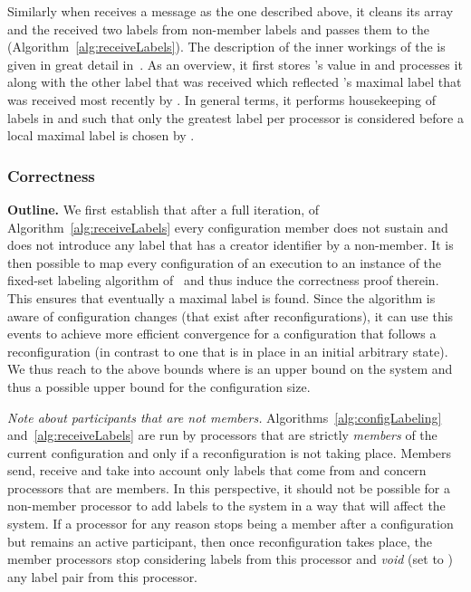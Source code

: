 \documentclass[11pt]{article}
\begin{document}
Similarly when  receives a message as the one described above, it cleans its  array and the received two labels from non-member labels and passes them to the  (Algorithm~\ref{alg:receiveLabels}).
The description of the inner workings of the  is given in great detail in~\cite{SSVS}. 
As an overview, it first stores 's value in  and processes it along with the other label that was received which reflected 's maximal label that was received most recently by .
In general terms, it performs housekeeping of labels in  and  such that only the greatest label per processor is considered before a local maximal label is chosen by .

\subsubsection{Correctness}
\textbf{Outline.} We first establish that after a full iteration, of Algorithm~\ref{alg:receiveLabels} every configuration member does not sustain and does not introduce  any label that has a creator identifier by a non-member.
It is then possible to map every configuration of an execution to an instance of the fixed-set labeling algorithm of~\cite{SSVS} and thus induce the correctness proof therein.
This ensures that eventually a maximal label is found.
Since the algorithm is aware of configuration changes (that exist after reconfigurations), it can use this events to achieve more efficient convergence for a configuration that follows a reconfiguration (in contrast to one that is in place in an initial arbitrary state). 
We thus reach to the above bounds where  is an upper bound on the system and thus a possible upper bound for the configuration size.


{\em Note about participants that are not members.} Algorithms~\ref{alg:configLabeling} and~\ref{alg:receiveLabels} are run by processors that are strictly \emph{members} of the current configuration and only if a reconfiguration is not taking place.
Members send, receive and take into account only labels that come from and concern processors that are members.
In this perspective, it should not be possible for a non-member processor to add labels to the system in a way that will affect the system.
If a processor for any reason stops being a member after a configuration but remains an active participant, then once reconfiguration takes place, the member processors stop considering labels from this processor and \textit{void} (set to ) any label pair from this processor. 
\end{document}
